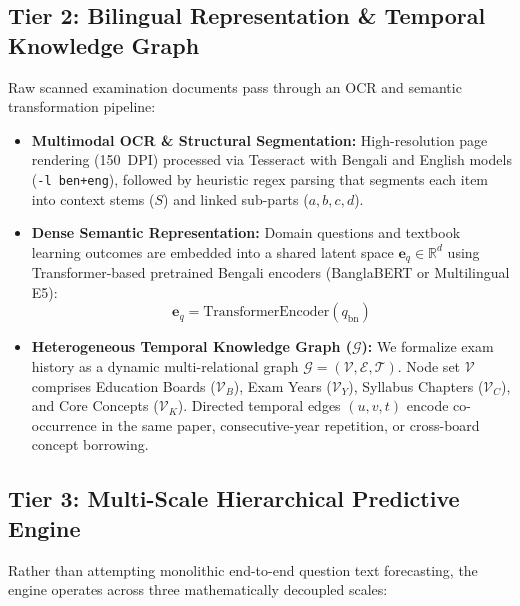 \documentclass[11pt,a4paper]{article}
\begin{document}
\subsection{Tier 2: Bilingual Representation \& Temporal Knowledge Graph}
Raw scanned examination documents pass through an OCR and semantic transformation pipeline:
\begin{itemize}[noitemsep,topsep=2pt]
    \item \textbf{Multimodal OCR \& Structural Segmentation:} High-resolution page rendering (150~DPI) processed via Tesseract with Bengali and English models (\texttt{-l ben+eng}), followed by heuristic regex parsing that segments each item into context stems ($S$) and linked sub-parts ($a, b, c, d$).
    \item \textbf{Dense Semantic Representation:} Domain questions and textbook learning outcomes are embedded into a shared latent space $\mathbf{e}_q \in \mathbb{R}^d$ using Transformer-based \cite{vaswani2017attention} pretrained Bengali encoders (BanglaBERT \cite{bhattacharjee2022banglabert} or Multilingual E5):
    \begin{equation}
        \mathbf{e}_q = \text{TransformerEncoder}(q_{\text{bn}})
    \end{equation}
    \item \textbf{Heterogeneous Temporal Knowledge Graph ($\mathcal{G}$):} We formalize exam history as a dynamic multi-relational graph $\mathcal{G} = (\mathcal{V}, \mathcal{E}, \mathcal{T})$. Node set $\mathcal{V}$ comprises Education Boards ($\mathcal{V}_B$), Exam Years ($\mathcal{V}_Y$), Syllabus Chapters ($\mathcal{V}_C$), and Core Concepts ($\mathcal{V}_K$). Directed temporal edges $(u, v, t)$ encode co-occurrence in the same paper, consecutive-year repetition, or cross-board concept borrowing.
\end{itemize}

\subsection{Tier 3: Multi-Scale Hierarchical Predictive Engine}
Rather than attempting monolithic end-to-end question text forecasting, the engine operates across three mathematically decoupled scales:
\end{document}
